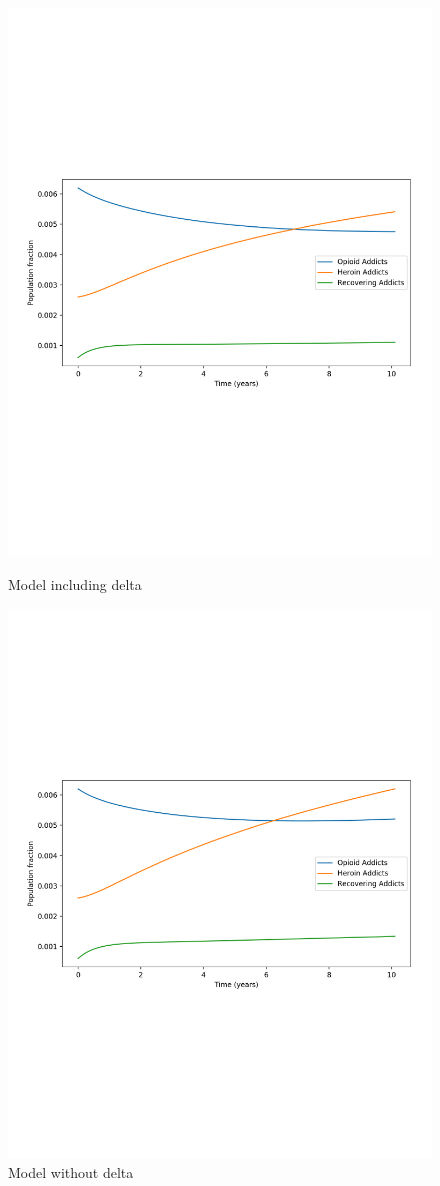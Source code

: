 \documentclass[12pt]{article}
\begin{document}
\vspace{-1cm}

\begin{figure}[!htb]
\hspace{-.8cm}
\begin{minipage}{.6\textwidth}
\centering
\includegraphics[width=.2\linewidth, height=0.26\textheight]{plot_with_delta_separate}
\vspace{-.4cm}
\caption{Model including delta}
\end{minipage}
\hspace{-1.3cm}
\vspace{.5cm}
\begin{minipage}{.6\textwidth}
\centering
\includegraphics[width=.9\linewidth, height=0.27\textheight]{plot_remove_delta_separate}
\vspace{-.5cm}
\caption{Model without delta}
\end{minipage}
\end{figure}
\end{document}
